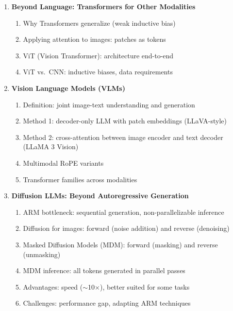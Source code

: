 \documentclass[11pt, a4paper]{article}
\begin{document}
\begin{enumerate}[label=\textbf{\arabic*.}, leftmargin=2em]
  \item \textbf{Beyond Language: Transformers for Other Modalities}
    \begin{enumerate}[label=\arabic{enumi}.\arabic*]
      \item Why Transformers generalize (weak inductive bias)
      \item Applying attention to images: patches as tokens
      \item ViT (Vision Transformer): architecture end-to-end
      \item ViT vs.\ CNN: inductive biases, data requirements
    \end{enumerate}

  \item \textbf{Vision Language Models (VLMs)}
    \begin{enumerate}[label=\arabic{enumi}.\arabic*]
      \item Definition: joint image-text understanding and generation
      \item Method 1: decoder-only LLM with patch embeddings (LLaVA-style)
      \item Method 2: cross-attention between image encoder and text decoder (LLaMA 3 Vision)
      \item Multimodal RoPE variants
      \item Transformer families across modalities
    \end{enumerate}

  \item \textbf{Diffusion LLMs: Beyond Autoregressive Generation}
    \begin{enumerate}[label=\arabic{enumi}.\arabic*]
      \item ARM bottleneck: sequential generation, non-parallelizable inference
      \item Diffusion for images: forward (noise addition) and reverse (denoising)
      \item Masked Diffusion Models (MDM): forward (masking) and reverse (unmasking)
      \item MDM inference: all tokens generated in parallel passes
      \item Advantages: speed ($\sim$10$\times$), better suited for some tasks
      \item Challenges: performance gap, adapting ARM techniques
    \end{enumerate}


\end{enumerate}
\end{document}
